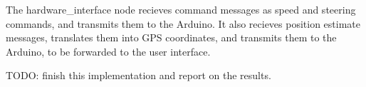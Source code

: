 The hardware\_interface node recieves command messages as speed and steering commands, and transmits them to the Arduino. It also recieves position estimate messages, translates them into GPS coordinates, and transmits them to the Arduino, to be forwarded to the user interface.

TODO: finish this implementation and report on the results.


